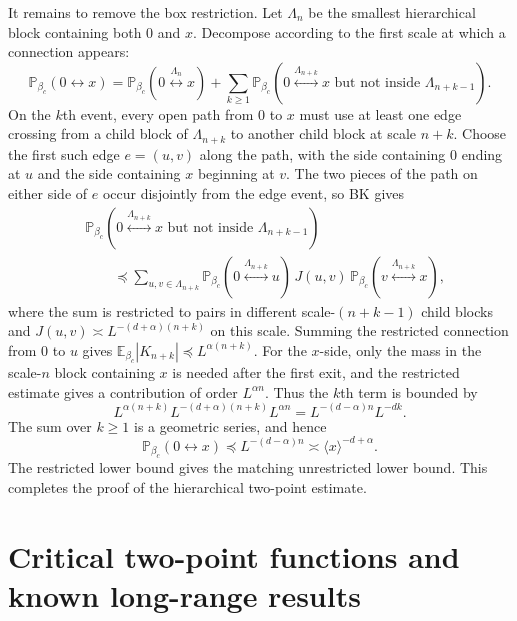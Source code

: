 \documentclass[11pt,reqno]{book}
\numberwithin{equation}{chapter}
\theoremstyle{plain}
\theoremstyle{definition}
\theoremstyle{remark}
\renewcommand{\P}{\mathbb P}
\newcommand{\E}{\mathbb E}
\newcommand{\1}{\mathbf 1}
\newcommand{\pre}{\preceq}
\begin{document}
It remains to remove the box restriction. Let \(\Lambda_n\) be the smallest
hierarchical block containing both \(0\) and \(x\). Decompose according to the
first scale at which a connection appears:
\[
  \P_{\beta_c}(0\leftrightarrow x)
  =
  \P_{\beta_c}(0\stackrel{\Lambda_n}{\longleftrightarrow}x)
  +
  \sum_{k\geq1}
  \P_{\beta_c}\!\left(
  0\stackrel{\Lambda_{n+k}}{\longleftrightarrow}x
  \text{ but not inside }\Lambda_{n+k-1}
  \right).
\]
On the \(k\)th event, every open path from \(0\) to \(x\) must use at least
one edge crossing from a child block of \(\Lambda_{n+k}\) to another child
block at scale \(n+k\). Choose the first such edge \(e=(u,v)\) along the path,
with the side containing \(0\) ending at \(u\) and the side containing \(x\)
beginning at \(v\). The two pieces of the path on either side of \(e\) occur
disjointly from the edge event, so BK gives
\[
\begin{aligned}
&\P_{\beta_c}\!\left(
  0\stackrel{\Lambda_{n+k}}{\longleftrightarrow}x
  \text{ but not inside }\Lambda_{n+k-1}
  \right)
\\
&\qquad\pre
  \sum_{u,v\in\Lambda_{n+k}}
  \P_{\beta_c}(0\stackrel{\Lambda_{n+k}}{\longleftrightarrow}u)\,
  J(u,v)\,
  \P_{\beta_c}(v\stackrel{\Lambda_{n+k}}{\longleftrightarrow}x),
\end{aligned}
\]
where the sum is restricted to pairs in different scale-\((n+k-1)\) child
blocks and \(J(u,v)\asymp L^{-(d+\alpha)(n+k)}\) on this scale. Summing the
restricted connection from \(0\) to \(u\) gives
\(\E_{\beta_c}|K_{n+k}|\pre L^{\alpha(n+k)}\). For the \(x\)-side, only the
mass in the scale-\(n\) block containing \(x\) is needed after the first exit,
and the restricted estimate gives a contribution of order \(L^{\alpha n}\).
Thus the \(k\)th term is bounded by
\[
  L^{\alpha(n+k)}
  L^{-(d+\alpha)(n+k)}
  L^{\alpha n}
  =
  L^{-(d-\alpha)n}L^{-dk}.
\]
The sum over \(k\geq1\) is a geometric series, and hence
\[
  \P_{\beta_c}(0\leftrightarrow x)
  \pre
  L^{-(d-\alpha)n}
  \asymp
  \langle x\rangle^{-d+\alpha}.
\]
The restricted lower bound gives the matching unrestricted lower bound. This
completes the proof of the hierarchical two-point estimate.

\section{Critical two-point functions and known long-range results}
\end{document}
